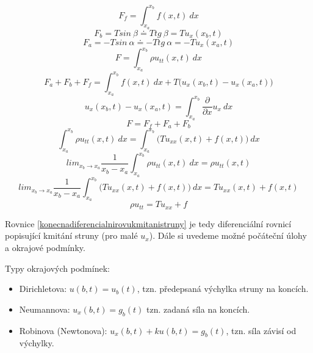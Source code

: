 \begin{equation}
F_f=\int_{x_a}^{x_b} f(x,t)\ dx
\end{equation}
\begin{equation}
F_b=T sin \ \beta \doteq T tg\ \beta=T u_x (x_b,t)
\end{equation}
\begin{equation}
F_a=-T sin \ \alpha \doteq -T tg\ \alpha=-T u_x (x_a,t)
\end{equation}
\begin{equation}
F=\int_{x_a}^{x_b} \rho u_{tt}(x,t)\ dx
\end{equation}
\begin{equation}
F_a+F_b+F_f=\int_{x_a}^{x_b}f(x,t)\ dx+T\bigg(u_x(x_b,t)-u_x(x_a,t)\bigg)
\end{equation}
\begin{equation}
u_x(x_b,t)-u_x(x_a,t)=\int_{x_a}^{x_b} \frac{\partial }{\partial x} u_x \ dx
\end{equation}
\begin{equation}
F=F_f+F_a+F_b
\end{equation}
\begin{equation}
\int_{x_a}^{x_b} \rho u_{tt}(x,t)\ dx=\int_{x_a}^{x_b} \bigg( Tu_{xx}(x,t)+f(x,t)\bigg)\ dx
\end{equation}
\begin{equation}
lim_{x_b \rightarrow x_a} \frac{1}{x_b-x_a} \int_{x_a}^{x_b} \rho u_{tt}(x,t)\ dx=\rho u_{tt}(x,t)
\end{equation}
\begin{equation}
lim_{x_b \rightarrow x_a} \frac{1}{x_b-x_a} \int_{x_a}^{x_b} \bigg( Tu_{xx}(x,t)+f(x,t) \bigg)\  dx=Tu_{xx}(x,t)+f(x,t)
\end{equation}
\begin{equation}
\rho u_{tt}=Tu_{xx}+f
\label{konecnadiferencialnirovukmitanistruny}
\end{equation}
 
 Rovnice \ref{konecnadiferencialnirovukmitanistruny} je tedy diferenciální rovnicí popisující kmitání struny (pro malé $u_x$). Dále si uvedeme možné počáteční úlohy a okrajové podmínky.
 
 Typy okrajových podmínek:
 \begin{itemize}
 \item Dirichletova: $u(b,t)=u_b(t)$, tzn. předepsaná výchylka struny na koncích.
 \item Neumannova: $u_x(b,t)=g_b(t)$ tzn. zadaná síla na koncích.
 \item Robinova (Newtonova): $u_x(b,t)+ku(b,t)=g_b(t)$, tzn. síla závisí od výchylky.
 \end{itemize}

